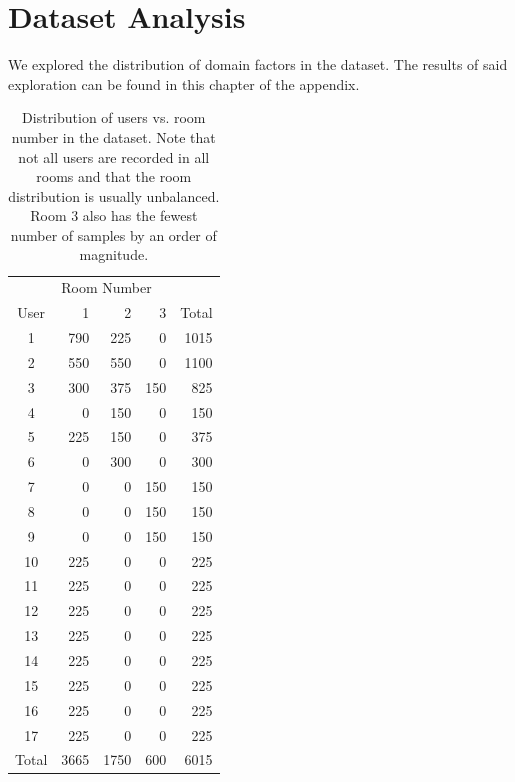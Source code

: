\chapter{Dataset Analysis}\label{appendix:dataset}

We explored the distribution of domain factors in the dataset.
The results of said exploration can be found in this chapter of the appendix.

\begin{table}[tbp]
	\centering
	\begin{tabular}{@{}crrrr@{}}
		\toprule
		& \multicolumn{3}{l}{Room Number} &             \\ 
		User        & 1         & 2         & 3       & Total       \\ \midrule
		1           & 790       & 225       & 0       & 1015        \\
		2           & 550       & 550       & 0       & 1100        \\
		3           & 300       & 375       & 150     & 825         \\
		4           & 0         & 150       & 0       & 150         \\
		5           & 225       & 150       & 0       & 375         \\
		6           & 0         & 300       & 0       & 300         \\
		7           & 0         & 0         & 150     & 150         \\
		8           & 0         & 0         & 150     & 150         \\
		9           & 0         & 0         & 150     & 150         \\
		10          & 225       & 0         & 0       & 225         \\
		11          & 225       & 0         & 0       & 225         \\
		12          & 225       & 0         & 0       & 225         \\
		13          & 225       & 0         & 0       & 225         \\
		14          & 225       & 0         & 0       & 225         \\
		15          & 225       & 0         & 0       & 225         \\
		16          & 225       & 0         & 0       & 225         \\
		17          & 225       & 0         & 0       & 225         \\ \midrule
		Total       & 3665      & 1750      & 600     & 6015        \\ \bottomrule
	\end{tabular}
	\caption{Distribution of users vs. room number in the dataset. Note that not all users are recorded in all rooms and that the room distribution is usually unbalanced. Room 3 also has the fewest number of samples by an order of magnitude.}
\end{table}

